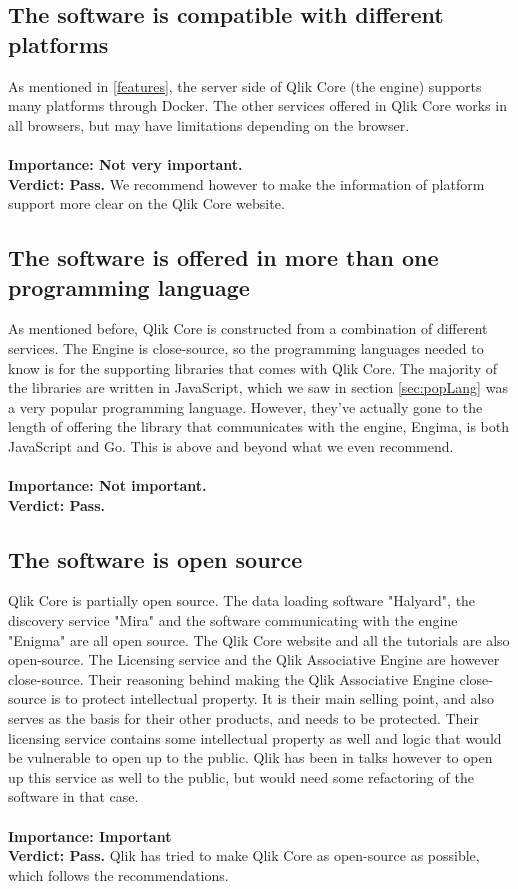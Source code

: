 \documentclass{cslthse-msc}
\begin{document}
    \subsection{The software is compatible with different platforms}
    As mentioned in \ref{features}, the server side of Qlik Core (the engine) supports many platforms through Docker. The other services offered in Qlik Core works in all browsers, but may have limitations depending on the browser. \\\\
    \textbf{Importance: Not very important.}\\
    \textbf{Verdict: Pass.} We recommend however to make the information of platform support more clear on the Qlik Core website.
    \subsection{The software is offered in more than one programming language}
    As mentioned before, Qlik Core is constructed from a combination of different services. The Engine is close-source, so the programming languages needed to know is for the supporting libraries that comes with Qlik Core. The majority of the libraries are written in JavaScript, which we saw in section \ref{sec:popLang} was a very popular programming language. However, they've actually gone to the length of offering the library that communicates with the engine, Engima, is both JavaScript and Go. This is above and beyond what we even recommend.\\\\
    \textbf{Importance: Not important.}\\
    \textbf{Verdict: Pass.}
    \subsection{The software is open source}
    Qlik Core is partially open source. The data loading software "Halyard", the discovery service "Mira" and the software communicating with the engine "Enigma" are all open source. The Qlik Core website and all the tutorials are also open-source. The Licensing service and the Qlik Associative Engine are however close-source. Their reasoning behind making the Qlik Associative Engine close-source is to protect intellectual property. It is their main selling point, and also serves as the basis for their other products, and needs to be protected. Their licensing service contains some intellectual property as well and logic that would be vulnerable to open up to the public. Qlik has been in talks however to open up this service as well to the public, but would need some refactoring of the software in that case.\\\\
    \textbf{Importance: Important}\\
    \textbf{Verdict: Pass.} Qlik has tried to make Qlik Core as open-source as possible, which follows the recommendations.
\end{document}
